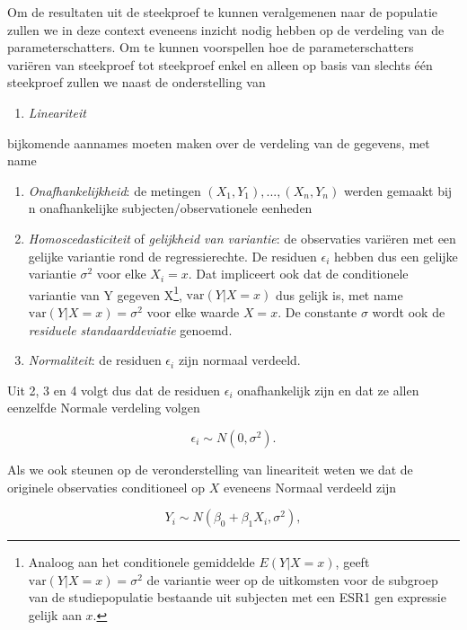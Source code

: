 \documentclass[
  12pt,dutch,coursenotes]{book}
\providecommand{\tightlist}{%
  \setlength{\itemsep}{0pt}\setlength{\parskip}{0pt}}
\theoremstyle{definition}
\theoremstyle{definition}
\theoremstyle{definition}
\theoremstyle{definition}
\theoremstyle{remark}
\begin{document}
Om de resultaten uit de steekproef te kunnen veralgemenen naar de populatie zullen we in deze context eveneens inzicht nodig hebben op de verdeling van de parameterschatters.
Om te kunnen voorspellen hoe de parameterschatters variëren van steekproef tot steekproef enkel en alleen op basis van slechts één steekproef zullen we naast de onderstelling van

\begin{enumerate}
\def\labelenumi{\arabic{enumi}.}
\tightlist
\item
  \emph{Lineariteit}
\end{enumerate}

bijkomende aannames moeten maken over de verdeling van de gegevens, met name

\begin{enumerate}
\def\labelenumi{\arabic{enumi}.}
\setcounter{enumi}{1}
\tightlist
\item
  \emph{Onafhankelijkheid}: de metingen \((X_1,Y_1), ..., (X_n,Y_n)\) werden gemaakt bij n onafhankelijke subjecten/observationele eenheden
\item
  \emph{Homoscedasticiteit} of \emph{gelijkheid van variantie}: de observaties variëren met een gelijke variantie rond de regressierechte. De residuen \(\epsilon_i\) hebben dus een gelijke variantie \(\sigma^2\) voor elke \(X_i=x\). Dat impliceert ook dat de conditionele variantie van Y gegeven X\footnote{Analoog aan het conditionele
    gemiddelde \(E(Y|X=x)\), geeft \(\text{var}(Y\vert X=x) = \sigma^2\) de variantie weer op de uitkomsten voor de subgroep van de studiepopulatie bestaande uit subjecten met een ESR1 gen expressie gelijk aan \(x\).}, \(\text{var}(Y\vert X=x)\) dus gelijk is, met name \(\text{var}(Y\vert X=x) = \sigma^2\) voor elke waarde \(X=x\). De constante \(\sigma\) wordt ook de \emph{residuele standaarddeviatie} genoemd.
\item
  \emph{Normaliteit}: de residuen \(\epsilon_i\) zijn normaal verdeeld.
\end{enumerate}

Uit 2, 3 en 4 volgt dus dat de residuen \(\epsilon_i\) onafhankelijk zijn en dat ze allen eenzelfde Normale verdeling volgen

\[\epsilon_i \sim N(0,\sigma^2).\]

Als we ook steunen op de veronderstelling van lineariteit weten we dat de originele observaties conditioneel op \(X\) eveneens Normaal verdeeld zijn

\[Y_i\sim N(\beta_0+\beta_1 X_i,\sigma^2),\]
\end{document}
